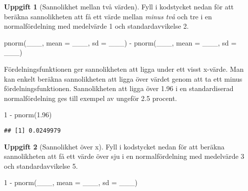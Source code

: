 \documentclass[
]{book}
\newenvironment{Shaded}{\begin{snugshade}}{\end{snugshade}}
\newcommand{\AttributeTok}[1]{\textcolor[rgb]{0.77,0.63,0.00}{#1}}
\newcommand{\DecValTok}[1]{\textcolor[rgb]{0.00,0.00,0.81}{#1}}
\newcommand{\FloatTok}[1]{\textcolor[rgb]{0.00,0.00,0.81}{#1}}
\newcommand{\FunctionTok}[1]{\textcolor[rgb]{0.00,0.00,0.00}{#1}}
\newcommand{\NormalTok}[1]{#1}
\newcommand{\SpecialCharTok}[1]{\textcolor[rgb]{0.00,0.00,0.00}{#1}}
\theoremstyle{definition}
\theoremstyle{definition}
\theoremstyle{definition}
\newtheorem{exercise}{Uppgift}[chapter]
\theoremstyle{definition}
\theoremstyle{remark}
\begin{document}
\begin{exercise}[Sannolikhet mellan två värden]

Fyll i kodstycket nedan för att beräkna sannolikheten att få ett värde mellan \emph{minus två} och tre i en normalfördelning med medelvärde 1 och standardavvikelse 2.

\begin{Shaded}
\begin{Highlighting}[]
\FunctionTok{pnorm}\NormalTok{(\_\_\_, }\AttributeTok{mean =}\NormalTok{ \_\_\_, }\AttributeTok{sd =}\NormalTok{ \_\_\_) }\SpecialCharTok{{-}} \FunctionTok{pnorm}\NormalTok{(\_\_\_, }\AttributeTok{mean =}\NormalTok{ \_\_\_, }\AttributeTok{sd =}\NormalTok{ \_\_\_)}
\end{Highlighting}
\end{Shaded}

\end{exercise}

Fördelningsfunktionen ger sannolikheten att ligga under ett visst x-värde. Man kan enkelt beräkna sannolikheten att ligga över värdet genom att ta ett minus fördelningsfunktionen. Sannolikheten att ligga över 1.96 i en standardiserad normalfördelning ges till exempel av ungeför 2.5 procent.

\begin{Shaded}
\begin{Highlighting}[]
\DecValTok{1} \SpecialCharTok{{-}} \FunctionTok{pnorm}\NormalTok{(}\FloatTok{1.96}\NormalTok{)}
\end{Highlighting}
\end{Shaded}

\begin{verbatim}
## [1] 0.0249979
\end{verbatim}

\begin{exercise}[Sannolikhet över x]

Fyll i kodstycket nedan för att beräkna sannolikheten att få ett värde över sju i en normalfördelning med medelvärde 3 och standardavvikelse 5.

\begin{Shaded}
\begin{Highlighting}[]
\DecValTok{1} \SpecialCharTok{{-}} \FunctionTok{pnorm}\NormalTok{(\_\_\_, }\AttributeTok{mean =}\NormalTok{ \_\_\_, }\AttributeTok{sd =}\NormalTok{ \_\_\_)}
\end{Highlighting}
\end{Shaded}

\end{exercise}
\end{document}
